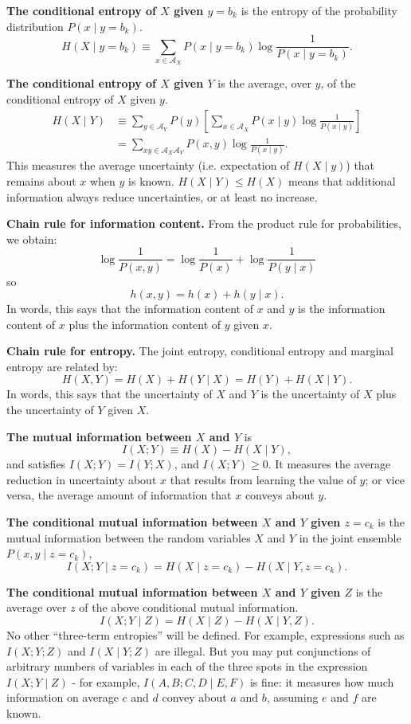 \documentclass[11pt]{article}
\begin{document}
\textbf{The conditional entropy of $X$ given $y=b_k$} is the entropy of the
probability distribution $P(x\mid y=b_k)$.
\[
  H(X\mid y=b_k) \equiv \sum_{x\in\mathcal{A}_X} P(x\mid y=b_k)\log \frac{1}{P(x\mid y=b_k)}.
\]

\textbf{The conditional entropy of $X$ given $Y$} is the average, over $y$, of
the conditional entropy of $X$ given $y$.
\begin{align*}
  H(X\mid Y)
  &\equiv \sum_{y\in\mathcal{A}_Y} P(y)
  \left[\sum_{x\in\mathcal{A}_X} P(x\mid y)\log \frac{1}{P(x\mid y)}\right]\\
  &= \sum_{xy\in\mathcal{A}_X\mathcal{A}_Y} P(x,y)\log \frac{1}{P(x\mid y)}.
\end{align*}
This measures the average uncertainty (i.e. expectation of $H(X\mid y)$) that remains about $x$ when $y$ is known. $H(X\mid Y) \leq H(X)$ means that additional information always reduce uncertainties, or at least no increase.

\textbf{Chain rule for information content.} From the product rule for
probabilities, we obtain:
\[
  \log \frac{1}{P(x,y)} = \log \frac{1}{P(x)} + \log \frac{1}{P(y\mid x)}
\]
so
\[
  h(x,y) = h(x) + h(y\mid x).
\]
In words, this says that the information content of $x$ and $y$ is the
information content of $x$ plus the information content of $y$ given $x$.

\textbf{Chain rule for entropy.} The joint entropy, conditional entropy and
marginal entropy are related by:
\[
  H(X,Y) = H(X) + H(Y\mid X) = H(Y) + H(X\mid Y).
\]
In words, this says that the uncertainty of $X$ and $Y$ is the uncertainty of
$X$ plus the uncertainty of $Y$ given $X$.

\textbf{The mutual information between $X$ and $Y$} is
\[
  I(X;Y) \equiv H(X) - H(X\mid Y),
\]
and satisfies $I(X;Y)=I(Y;X)$, and $I(X;Y)\geq 0$. It measures the average
reduction in uncertainty about $x$ that results from learning the value of $y$;
or vice versa, the average amount of information that $x$ conveys about $y$.

\textbf{The conditional mutual information between $X$ and $Y$ given $z=c_k$}
is the mutual information between the random variables $X$ and $Y$ in the joint
ensemble $P(x,y\mid z=c_k)$,
\[
  I(X;Y\mid z=c_k) = H(X\mid z=c_k) - H(X\mid Y,z=c_k).
\]

\textbf{The conditional mutual information between $X$ and $Y$ given $Z$} is
the average over $z$ of the above conditional mutual information.
\[
  I(X;Y\mid Z) = H(X\mid Z) - H(X\mid Y,Z).
\]
No other ``three-term entropies'' will be defined. For example, expressions such
as $I(X;Y;Z)$ and $I(X\mid Y;Z)$ are illegal. But you may put conjunctions of
arbitrary numbers of variables in each of the three spots in the expression
$I(X;Y\mid Z)$ - for example, $I(A,B;C,D\mid E,F)$ is fine: it measures how much
information on average $c$ and $d$ convey about $a$ and $b$, assuming $e$ and
$f$ are known.
\end{document}
